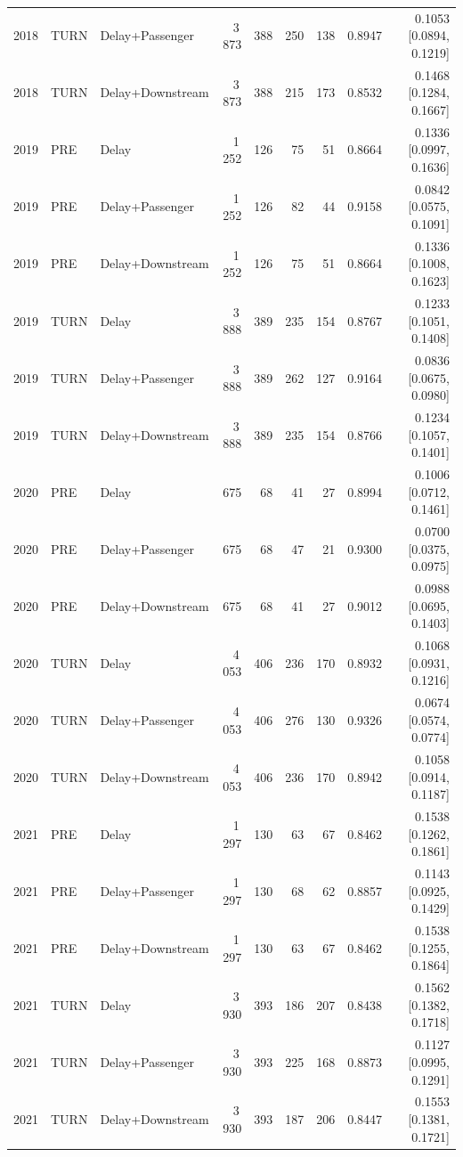 \documentclass[10pt,a4paper]{article}
\numberwithin{equation}{section}
\begin{document}
\begin{table}[htbp]
\begin{tabular}{lllrrrrrr}
2018 & TURN & Delay+Passenger & 3\,873 & 388 & 250 & 138 & 0.8947 & 0.1053 [0.0894, 0.1219] \\
2018 & TURN & Delay+Downstream & 3\,873 & 388 & 215 & 173 & 0.8532 & 0.1468 [0.1284, 0.1667] \\
2019 & PRE & Delay & 1\,252 & 126 & 75 & 51 & 0.8664 & 0.1336 [0.0997, 0.1636] \\
2019 & PRE & Delay+Passenger & 1\,252 & 126 & 82 & 44 & 0.9158 & 0.0842 [0.0575, 0.1091] \\
2019 & PRE & Delay+Downstream & 1\,252 & 126 & 75 & 51 & 0.8664 & 0.1336 [0.1008, 0.1623] \\
2019 & TURN & Delay & 3\,888 & 389 & 235 & 154 & 0.8767 & 0.1233 [0.1051, 0.1408] \\
2019 & TURN & Delay+Passenger & 3\,888 & 389 & 262 & 127 & 0.9164 & 0.0836 [0.0675, 0.0980] \\
2019 & TURN & Delay+Downstream & 3\,888 & 389 & 235 & 154 & 0.8766 & 0.1234 [0.1057, 0.1401] \\
2020 & PRE & Delay & 675 & 68 & 41 & 27 & 0.8994 & 0.1006 [0.0712, 0.1461] \\
2020 & PRE & Delay+Passenger & 675 & 68 & 47 & 21 & 0.9300 & 0.0700 [0.0375, 0.0975] \\
2020 & PRE & Delay+Downstream & 675 & 68 & 41 & 27 & 0.9012 & 0.0988 [0.0695, 0.1403] \\
2020 & TURN & Delay & 4\,053 & 406 & 236 & 170 & 0.8932 & 0.1068 [0.0931, 0.1216] \\
2020 & TURN & Delay+Passenger & 4\,053 & 406 & 276 & 130 & 0.9326 & 0.0674 [0.0574, 0.0774] \\
2020 & TURN & Delay+Downstream & 4\,053 & 406 & 236 & 170 & 0.8942 & 0.1058 [0.0914, 0.1187] \\
2021 & PRE & Delay & 1\,297 & 130 & 63 & 67 & 0.8462 & 0.1538 [0.1262, 0.1861] \\
2021 & PRE & Delay+Passenger & 1\,297 & 130 & 68 & 62 & 0.8857 & 0.1143 [0.0925, 0.1429] \\
2021 & PRE & Delay+Downstream & 1\,297 & 130 & 63 & 67 & 0.8462 & 0.1538 [0.1255, 0.1864] \\
2021 & TURN & Delay & 3\,930 & 393 & 186 & 207 & 0.8438 & 0.1562 [0.1382, 0.1718] \\
2021 & TURN & Delay+Passenger & 3\,930 & 393 & 225 & 168 & 0.8873 & 0.1127 [0.0995, 0.1291] \\
2021 & TURN & Delay+Downstream & 3\,930 & 393 & 187 & 206 & 0.8447 & 0.1553 [0.1381, 0.1721] \\

\end{tabular}
\end{table}
\end{document}
